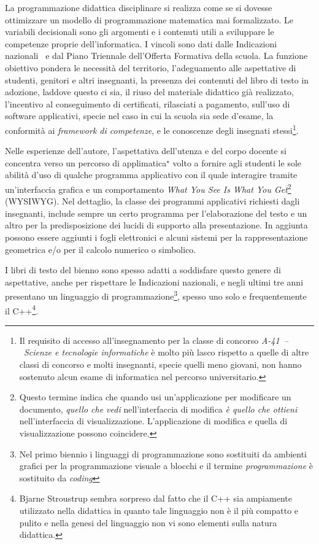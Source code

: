 \documentclass[a4paper]{easychair}
\begin{document}
La programmazione didattica disciplinare si realizza come se si
dovesse ottimizzare un modello di programmazione matematica mai formalizzato.
Le variabili decisionali sono gli argomenti e i contenuti
utili a sviluppare le competenze proprie dell'informatica.
I vincoli sono dati dalle Indicazioni nazionali~\cite{IlMinistro2010} e
dal Piano Triennale dell'Offerta Formativa della scuola.
La funzione obiettivo pondera le necessità del territorio,
l'adeguamento alle aspettative di studenti, genitori e altri insegnanti,
la presenza dei contenuti del libro di testo in adozione, laddove questo ci sia,
il riuso del materiale didattico già realizzato,
l'incentivo al conseguimento di certificati, rilasciati a pagamento, sull'uso di software applicativi,
specie nel caso in cui la scuola sia sede d'esame,
la conformità ai \textit{framework di competenze},
e le conoscenze degli insegnati stessi\footnote{Il requisito di accesso all'insegnamento per la classe di concorso \textit{A-41~--~Scienze e tecnologie informatiche} è molto più lasco rispetto a quelle di altre classi di concorso e molti insegnanti, specie quelli meno giovani, non hanno sostenuto alcun esame di informatica nel percorso universitario.}.

Nelle esperienze dell'autore, l'aspettativa dell'utenza e del corpo docente si concentra
verso un percorso di applimatica$\phantom{}^\star$ volto a fornire agli studenti
le sole abilità d'uso di qualche programma applicativo con il quale interagire tramite
un'interfaccia grafica e un comportamento \textit{What You See Is What You Get}\footnote{Questo termine indica che quando usi un'applicazione per modificare un documento, \textit{quello che vedi} nell'interfaccia di modifica \textit{è quello che ottieni} nell'interfaccia di visualizzazione. L'applicazione di modifica e quella di visualizzazione possono coincidere.} (WYSIWYG).
Nel dettaglio, la classe dei programmi applicativi richiesti dagli insegnanti,
include sempre un certo programma per l'elaborazione del testo e un altro per la predisposizione dei lucidi di supporto alla presentazione.
In aggiunta possono essere aggiunti i fogli elettronici e alcuni sistemi per la rappresentazione geometrica e/o per il calcolo numerico o simbolico.

I libri di testo del bienno sono spesso adatti a soddisfare questo genere di aspettative, anche per rispettare le Indicazioni nazionali,
e negli ultimi tre anni presentano un linguaggio di programmazione\footnote{%
Nel primo biennio i linguaggi di programmazione sono sostituiti da ambienti grafici per la programmazione visuale a blocchi e il termine \textit{programmazione} è sostituito da \textit{coding}},
spesso uno solo e frequentemente il C++\footnote{Bjarne Stroustrup sembra sorpreso dal fatto che il C++ sia ampiamente utilizzato nella didattica in quanto tale linguaggio non è il più compatto e pulito e nella genesi del linguaggio non vi sono elementi sulla natura didattica.%
}.
\end{document}
